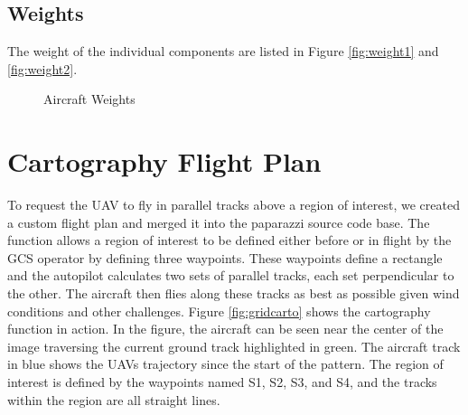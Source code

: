 \documentclass[a4paper,11pt]{report}
\begin{document}
\subsection{Weights}

The weight of the individual components are listed in Figure \ref{fig:weight1} and \ref{fig:weight2}.

\begin{figure}[ht]
  \centering
  \caption{Aircraft Weights}
  \label{fig:weights}
\end{figure} 

\section{Cartography Flight Plan}

To request the UAV to fly in parallel tracks above a region of interest, we created a custom flight plan and merged it into the paparazzi source code base. The function allows a region of interest to be defined either before or in flight by the GCS operator by defining three waypoints. These waypoints define a rectangle and the autopilot calculates two sets of parallel tracks, each set perpendicular to the other. The aircraft then flies along these tracks as best as possible given wind conditions and other challenges. Figure \ref{fig:gridcarto} shows the cartography function in action. In the figure, the aircraft can be seen near the center of the image traversing the current ground track highlighted in green. The aircraft track in blue shows the UAVs trajectory since the start of the pattern. The region of interest is defined by the waypoints named S1, S2, S3, and S4, and the tracks within the region are all straight lines.
\end{document}
